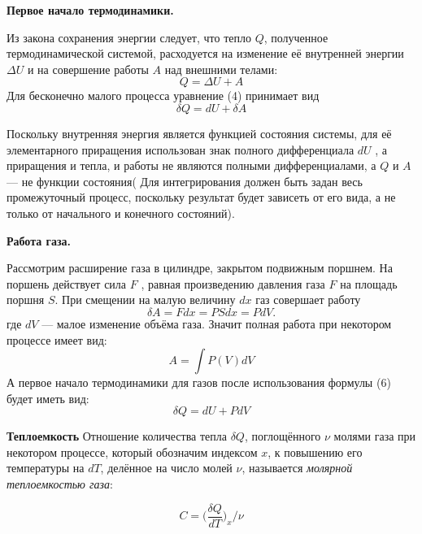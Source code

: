 \documentclass[10pt]{article}
\begin{document}
    \textbf{ Первое начало термодинамики.}

    Из закона сохранения энергии следует, что тепло $Q$, полученное термодинамической системой, расходуется на изменение её внутренней энергии $\Delta U$ и на совершение работы $A$ над внешними телами:
    \begin{equation}
        Q = \Delta U + A
    \end{equation}
    Для бесконечно малого процесса уравнение (4) принимает вид 
    \begin{equation}
        \delta Q = dU + \delta A
    \end{equation}

    Поскольку внутренняя энергия является функцией состояния системы, для её элементарного приращения использован знак полного дифференциала $dU$ , а приращения и тепла, и работы не являются полными дифференциалами, а $Q$ и $A$ — не функции состояния(
    Для интегрирования должен быть задан весь промежуточный процесс, поскольку результат будет зависеть от его вида, а не только от начального и конечного состояний).

    \textbf{ Работа газа.}

    Рассмотрим расширение газа в цилиндре, закрытом подвижным поршнем. На поршень действует сила $F$ , равная произведению давления газа $F$ на площадь поршня $S$. При смещении на малую величину $dx$ газ совершает работу
    \begin{equation}
        \delta A = F dx = P S dx = P dV.
    \end{equation}
    где $dV$  — малое изменение объёма газа.
    Значит полная работа при некотором процессе имеет вид:
    \begin{equation}
        A = \int P(V) dV
    \end{equation}
    А первое начало термодинамики для газов после использования формулы (6) будет иметь вид:
    \begin{equation}
        \delta Q = dU + P dV
    \end{equation}

    \textbf{Теплоемкость}
    Отношение количества тепла $\delta Q$, поглощённого $\nu$ молями газа при некотором процессе, который обозначим индексом $x$, к повышению его температуры на $dT$, делённое на число молей $\nu$, называется \textit{молярной теплоемкостью газа}:

    \begin{equation}
        C = \bigg(\frac{\delta Q}{dT}\bigg)_x / \nu
    \end{equation}
\end{document}
